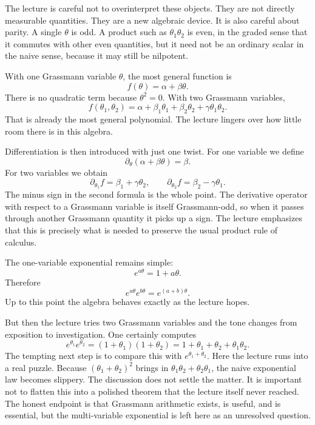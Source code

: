 The lecture is careful not to overinterpret these objects. They are not directly measurable quantities. They are a new algebraic device. It is also careful about parity. A single \(\theta\) is odd. A product such as \(\theta_1\theta_2\) is even, in the graded sense that it commutes with other even quantities, but it need not be an ordinary scalar in the naive sense, because it may still be nilpotent.

With one Grassmann variable \(\theta\), the most general function is
\begin{equation}
f(\theta)=\alpha+\beta\theta.
\end{equation}
There is no quadratic term because \(\theta^2=0\). With two Grassmann variables,
\begin{equation}
f(\theta_1,\theta_2)=\alpha+\beta_1\theta_1+\beta_2\theta_2+\gamma\theta_1\theta_2.
\end{equation}
That is already the most general polynomial. The lecture lingers over how little room there is in this algebra.

Differentiation is then introduced with just one twist. For one variable we define
\begin{equation}
\partial_\theta(\alpha+\beta\theta)=\beta.
\end{equation}
For two variables we obtain
\begin{equation}
\partial_{\theta_1}f=\beta_1+\gamma\theta_2,
\qquad
\partial_{\theta_2}f=\beta_2-\gamma\theta_1.
\end{equation}
The minus sign in the second formula is the whole point. The derivative operator with respect to a Grassmann variable is itself Grassmann-odd, so when it passes through another Grassmann quantity it picks up a sign. The lecture emphasizes that this is precisely what is needed to preserve the usual product rule of calculus.

The one-variable exponential remains simple:
\begin{equation}
e^{a\theta}=1+a\theta.
\end{equation}
Therefore
\begin{equation}
e^{a\theta}e^{b\theta}=e^{(a+b)\theta}.
\end{equation}
Up to this point the algebra behaves exactly as the lecture hopes.

But then the lecture tries two Grassmann variables and the tone changes from exposition to investigation. One certainly computes
\begin{equation}
e^{\theta_1}e^{\theta_2}=(1+\theta_1)(1+\theta_2)=1+\theta_1+\theta_2+\theta_1\theta_2.
\end{equation}
The tempting next step is to compare this with \(e^{\theta_1+\theta_2}\). Here the lecture runs into a real puzzle. Because \((\theta_1+\theta_2)^2\) brings in \(\theta_1\theta_2+\theta_2\theta_1\), the naive exponential law becomes slippery. The discussion does not settle the matter. It is important not to flatten this into a polished theorem that the lecture itself never reached. The honest endpoint is that Grassmann arithmetic exists, is useful, and is essential, but the multi-variable exponential is left here as an unresolved question.

